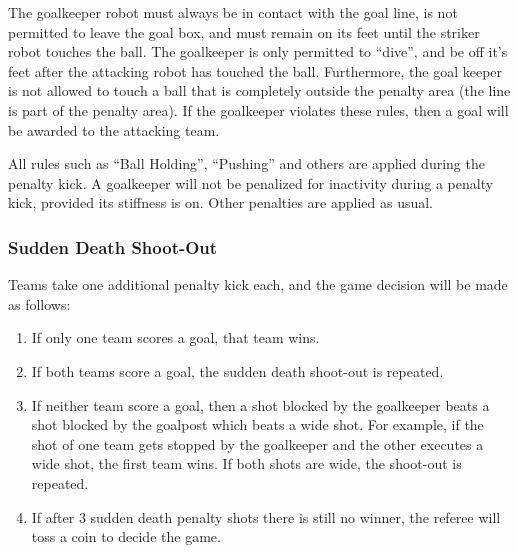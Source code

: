 \documentclass[12pt]{article}
\newcommand{\ie}{\mbox{i.\,e.}\xspace}
\newcommand{\PenaltyKickTime}{30 seconds\xspace}
\begin{document}
The goalkeeper robot must always be in contact with the goal line, is not permitted to leave the goal box, and must remain on its feet until the striker robot touches the ball.
The goalkeeper is only permitted to ``dive'', and be off it's feet after the attacking robot has touched the ball.
Furthermore, the goal keeper is not allowed to touch a ball that is completely outside the penalty area (the line is part of the penalty area).
If the goalkeeper violates these rules, then a goal will be awarded to the attacking team.

All rules such as ``Ball Holding'', ``Pushing'' and others are applied during the penalty kick.
A goalkeeper will not be penalized for inactivity during a penalty kick, provided its stiffness is on.
Other penalties are applied as usual.

\subsubsection{Sudden Death Shoot-Out}
\label{sec:sudden_death_shoot_out}

Teams take one additional penalty kick each, and the game decision will be made as follows:
\begin{enumerate}
  \item If only one team scores a goal, that team wins.
  \item If both teams score a goal, the sudden death shoot-out is repeated.
  \item If neither team score a goal, then a shot blocked by the goalkeeper beats a shot blocked by the goalpost which beats a wide shot. For example, if the shot of one team gets stopped by the goalkeeper and the other executes a wide shot, the first team wins. If both shots are wide, the shoot-out is repeated.
  \item If after 3 sudden death penalty shots there is still no winner, the referee will toss a coin to decide the game.
\end{enumerate}
\end{document}
